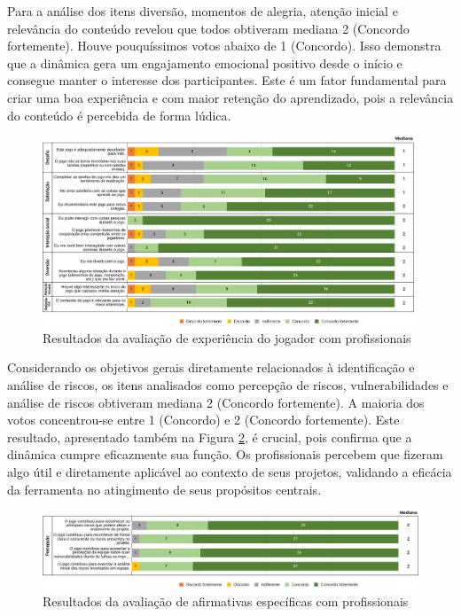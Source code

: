 \documentclass[
	12pt,
	openright,
	twoside,
	a4paper,
	english,
	brazil
	]{abntex2}
\begin{document}
Para a análise dos itens diversão, momentos de alegria, atenção inicial e relevância do conteúdo revelou que todos obtiveram mediana 2 (Concordo fortemente). Houve pouquíssimos votos abaixo de 1 (Concordo). Isso demonstra que a dinâmica gera um engajamento emocional positivo desde o início e consegue manter o interesse dos participantes. Este é um fator fundamental para criar uma boa experiência e com maior retenção do aprendizado, pois a relevância do conteúdo é percebida de forma lúdica.

\begin{figure}[H]
	\caption{\label{bridge-xp-jogador} Resultados da avaliação de experiência do jogador com profissionais}
  \includegraphics[width=\textwidth]{bridge-xp-jogador}
\end{figure}

Considerando os objetivos gerais diretamente relacionados à identificação e análise de riscos, os itens analisados como percepção de riscos, vulnerabilidades e análise de riscos obtiveram mediana 2 (Concordo fortemente). A maioria dos votos concentrou-se entre 1 (Concordo) e 2 (Concordo fortemente). Este resultado, apresentado também na Figura \ref{bridge-afirmativas}, é crucial, pois confirma que a dinâmica cumpre eficazmente sua função. Os profissionais percebem que fizeram algo útil e diretamente aplicável ao contexto de seus projetos, validando a eficácia da ferramenta no atingimento de seus propósitos centrais.

\begin{figure}[H]
	\caption{\label{bridge-afirmativas} Resultados da avaliação de afirmativas específicas com profissionais}
  \includegraphics[width=\textwidth]{bridge-afirmativas}
\end{figure}
\end{document}
